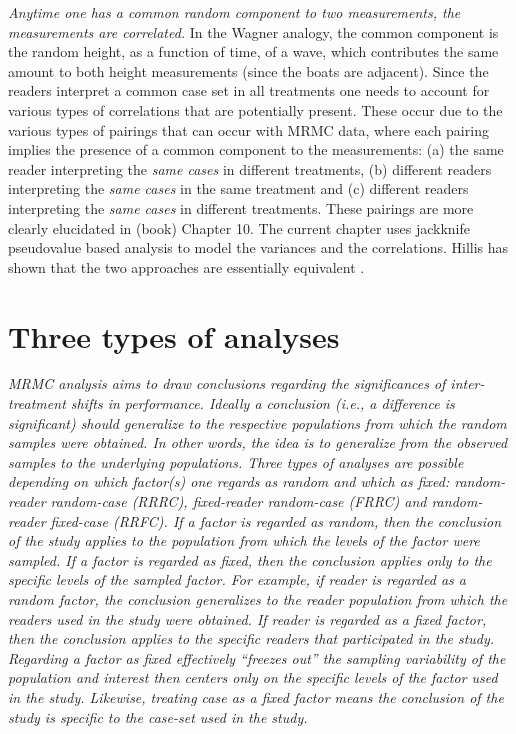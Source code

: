 \documentclass[
]{book}
\begin{document}
\emph{Anytime one has a common random component to two measurements, the measurements are correlated.} In the Wagner analogy, the common component is the random height, as a function of time, of a wave, which contributes the same amount to both height measurements (since the boats are adjacent). Since the readers interpret a common case set in all treatments one needs to account for various types of correlations that are potentially present. These occur due to the various types of pairings that can occur with MRMC data, where each pairing implies the presence of a common component to the measurements: (a) the same reader interpreting the \emph{same cases} in different treatments, (b) different readers interpreting the \emph{same cases} in the same treatment and (c) different readers interpreting the \emph{same cases} in different treatments. These pairings are more clearly elucidated in (book) Chapter 10. The current chapter uses jackknife pseudovalue based analysis to model the variances and the correlations. Hillis has shown that the two approaches are essentially equivalent \citep{RN1866}.

\hypertarget{dbm-analysis-background-threeAnalyses}{%
\section{Three types of analyses}\label{dbm-analysis-background-threeAnalyses}}

\emph{MRMC analysis aims to draw conclusions regarding the significances of inter-treatment shifts in performance. Ideally a conclusion (i.e., a difference is significant) should generalize to the respective populations from which the random samples were obtained. In other words, the idea is to generalize from the observed samples to the underlying populations. Three types of analyses are possible depending on which factor(s) one regards as random and which as fixed: random-reader random-case (RRRC), fixed-reader random-case (FRRC) and random-reader fixed-case (RRFC). If a factor is regarded as random, then the conclusion of the study applies to the population from which the levels of the factor were sampled. If a factor is regarded as fixed, then the conclusion applies only to the specific levels of the sampled factor. For example, if reader is regarded as a random factor, the conclusion generalizes to the reader population from which the readers used in the study were obtained. If reader is regarded as a fixed factor, then the conclusion applies to the specific readers that participated in the study. Regarding a factor as fixed effectively ``freezes out'' the sampling variability of the population and interest then centers only on the specific levels of the factor used in the study. Likewise, treating case as a fixed factor means the conclusion of the study is specific to the case-set used in the study.}
\end{document}
